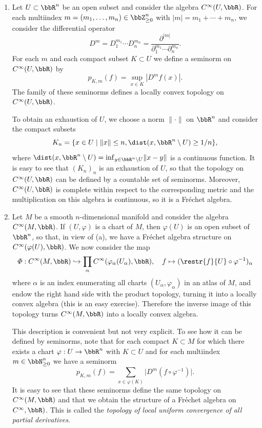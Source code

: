 \begin{example}
    \begin{enumerate}[label=(\alph*)]
        \item Let $U\subset \bbR^n$ be an open subset and consider the algebra $C^\infty(U,\bbR)$. For each multiindex $m=(m_1,\ldots,m_n)\in\bbZ_{\geq 0}^n$ with $|m|=m_1+\cdots+m_n$, we consider the differential operator
        \[D^m=D_1^{m_1}\cdots D_n^{m_n}=\frac{\partial^{|m|}}{{\partial_1^{m_1}\cdots \partial_n^{m_n}}}.\]
        For each $m$ and each compact subset $K\subset U$ we define a seminorm on $C^\infty(U,\bbR)$ by 
        \[p_{K,m}(f)=\sup_{x\in K}|D^mf(x)|.\]
        The family of these seminorms defines a locally convex topology on $C^\infty(U,\bbR)$.

        To obtain an exhaustion of $U$, we choose a norm $\lVert\cdot\rVert$ on $\bbR^n$ and consider the compact subsets
        \[K_n=\{x\in U\mid \lVert x\rVert\leq n, \dist(x,\bbR^n\setminus U)\geq 1/n\},\]
        where $\dist(x,\bbR^n\setminus U)=\inf_{y\in \bbR^n\setminus U} \lVert x-y\rVert$ is a continuous function. It is easy to see that $(K_n)_n$ is an exhaustion of $U$, so that the topology on $C^\infty(U,\bbR)$ can be defined by a countable set of seminorms. Moreover, $C^\infty(U,\bbR)$ is complete within respect to the corresponding metric and the multiplication on this algebra is continuous, so it is a Fr\'echet algebra.
        
        \item Let $M$ be a smooth $n$-dimensional manifold and consider the algebra $C^\infty(M,\bbR)$. If $(U,\varphi)$ is a chart of $M$, then $\varphi(U)$ is an open subset of $\bbR^n$, so that, in view of (a), we have a Fr\'echet algebra structure on $C^\infty(\varphi(U),\bbR)$. We now consider the map
        \[\varPhi:C^\infty(M,\bbR)\hookrightarrow \prod_{\alpha}C^\infty(\varphi_\alpha(U_\alpha),\bbR),\quad f\mapsto (\restr{f}{U}\circ \varphi^{-1})_\alpha\]
        where $\alpha$ is an index enumerating all charts $(U_\alpha,\varphi_\alpha)$ in an atlas of $M$, and endow the right hand side with the product topology, turning it into a locally convex algebra (this is an easy exercise). Therefore the inverse image of this topology turns $C^\infty(M,\bbR)$ into a locally convex algebra.

        This description is convenient but not very explicit. To see how it can be defined by seminorms, note that for each compact $K\subset M$ for which there exists a chart $\varphi:U\to \bbR^n$ with $K\subset U$ and for each multiindex $m\in \bbN_{\geq 0}^n$ we have a seminorm
        \[p_{K,m}(f)=\sum_{x\in \varphi(K)}\lvert D^m(f\circ \varphi^{-1})\rvert.\]
        It is easy to see that these seminorms define the same topology on $C^\infty(M,\bbR)$ and that we obtain the structure of a Fr\'echet algebra on $C^\infty,\bbR)$. This is called the \emph{topology of local uniform convergence of all partial derivatives}.


\end{enumerate}
\end{example}
